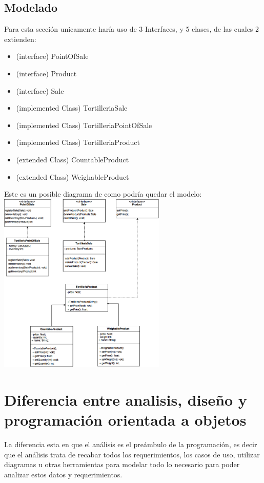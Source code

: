 \documentclass[spanish,12pt,letterpapper]{article}
\begin{document}
	\subsection{Modelado}
	Para esta sección unicamente haría uso de 3 Interfaces, y 5 clases, de las cuales 2 extienden:
	\begin{itemize}
		\item (interface) PointOfSale
		\item (interface) Product
		\item (interface) Sale
		\item (implemented Class) TortilleriaSale
		\item (implemented Class) TortilleriaPointOfSale
		\item (implemented Class) TortilleriaProduct
		\item (extended Class) CountableProduct
		\item (extended Class) WeighableProduct \pagebreak
	\end{itemize}
	
	\begin{center}
		Este es un posible diagrama de como podría quedar el modelo: \\[1cm]
		\includegraphics[width=0.6\textwidth]{./OODiagram}~\\[1cm]
	\end{center}

	
	
	\section{Diferencia entre analisis, diseño y programación orientada a objetos}
	
	La diferencia esta en que el análisis es el preámbulo de la programación, es decir que el análisis trata de recabar todos los requerimientos, los casos de uso, utilizar diagramas u otras herramientas para modelar todo lo necesario para poder analizar estos datos y requerimientos.\\
	
\end{document}
